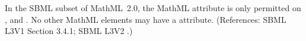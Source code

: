 In the SBML subset of MathML~2.0, the MathML attribute
 is only permitted on ,  and
.  No other MathML elements may have a
 attribute.  (References: SBML L3V1 Section 3.4.1; SBML L3V2
.) 

